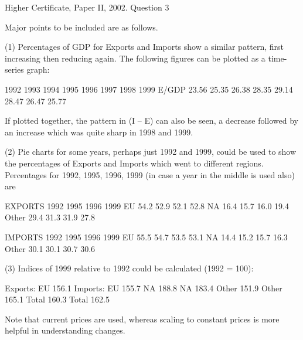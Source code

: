 Higher Certificate, Paper II, 2002.  Question 3 
 
 
Major points to be included are as follows. 
 
 
(1) Percentages of GDP for Exports and Imports show a similar pattern, first increasing then reducing again.  The following figures can be plotted as a time-series graph: 
 
  1992 1993 1994 1995 1996 1997 1998 1999 E/GDP 23.56 25.35 26.38 28.35 29.14 28.47 26.47 25.77         %
 
If plotted together, the pattern in (I – E) can also be seen, a decrease followed by an increase which was quite sharp in 1998 and 1999. 
 
 
(2) Pie charts for some years, perhaps just 1992 and 1999, could be used to show the percentages of Exports and Imports which went to different regions.  Percentages for 1992, 1995, 1996, 1999 (in case a year in the middle is used also) are 
 
EXPORTS 1992 1995 1996 1999 EU 54.2 52.9 52.1 52.8 NA 16.4 15.7 16.0 19.4 Other 29.4 31.3 31.9 27.8 
 
IMPORTS 1992 1995 1996 1999 EU 55.5 54.7 53.5 53.1 NA 14.4 15.2 15.7 16.3 Other 30.1 30.1 30.7 30.6 
 
 
(3) Indices of 1999 relative to 1992 could be calculated (1992 = 100): 
 
Exports: EU 156.1   Imports: EU 155.7   NA 188.8     NA 183.4   Other 151.9     Other 165.1 
   Total 160.3     Total 162.5 
 
 
 
Note that current prices are used, whereas scaling to constant prices is more helpful in understanding changes. 
